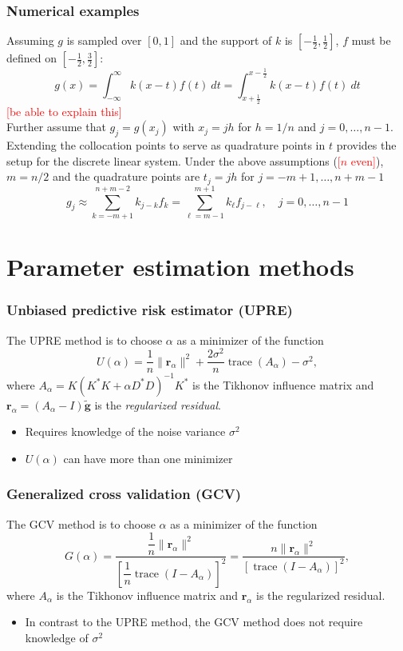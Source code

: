\documentclass{beamer}
\newcommand{\ToDo}[1]{\textcolor{red}{[#1]}}
\newcommand{\noiseSD}{\sigma}	%
\newcommand{\gnoiseVec}{\widetilde{\mathbf{g}}}	%
\newcommand{\kMat}{K}	%
\newcommand{\ctrans}{*}	%
\DeclareMathOperator{\trace}{trace}		%
\newcommand{\regparam}{\alpha}
\newcommand{\regres}{\mathbf{r}_{\regparam}}	%
\newcommand{\A}{A_{\regparam}}	%
\newcommand{\U}{U}	%
\newcommand{\GCV}{G}	%
\begin{document}
\begin{frame}
\frametitle{Numerical examples}
Assuming $g$ is sampled over $[0,1]$ and the support of $k$ is $[-\frac{1}{2},\frac{1}{2}]$, $f$ must be defined on $[-\frac{1}{2},\frac{3}{2}]$:
\[g(x) = \int_{-\infty}^{\infty} k(x-t)f(t)~dt = \int_{x+\frac{1}{2}}^{x-\frac{1}{2}} k(x-t)f(t)~dt\]
\ToDo{be able to explain this} \\
Further assume that $g_j = g(x_j)$ with $x_j = jh$ for $h = 1/n$ and $j = 0,\ldots,n-1$. Extending the collocation points to serve as quadrature points in $t$ provides the setup for the discrete linear system. Under the above assumptions (\ToDo{$n$ even}), $m = n/2$ and the quadrature points are $t_j = jh$ for $j = -m+1,\ldots,n+m-1$
\[g_j \approx \sum_{k=-m+1}^{n+m-2} k_{j-k}f_{k} = \sum_{\ell=m-1}^{m+1} k_{\ell}f_{j-\ell}, \quad j = 0,\ldots,n-1\]
\end{frame}

\section{Parameter estimation methods}

\begin{frame}
\frametitle{Unbiased predictive risk estimator (UPRE)}
The UPRE method \cite{Mallows1973} is to choose $\regparam$ as a minimizer of the function
\[\U(\regparam) = \frac{1}{n}\|\regres\|^2 + \frac{2\noiseSD^2}{n}\trace(\A) - \noiseSD^2,\]
where $\A = \kMat(\kMat^\ctrans{\kMat} + \regparam{D^\ctrans}D)^{-1}\kMat^\ctrans$ is the Tikhonov influence matrix and $\regres = (\A - I)\gnoiseVec$ is the \textit{regularized residual}.
\begin{itemize}
\item Requires knowledge of the noise variance $\noiseSD^2$
\item $\U(\regparam)$ can have more than one minimizer
\end{itemize}
\end{frame}

\begin{frame}
\frametitle{Generalized cross validation (GCV)}
The GCV method \cite{Wahba1977,Wahba1990} is to choose $\regparam$ as a minimizer of the function
\[\GCV(\regparam) = \frac{\dfrac{1}{n}\|\regres\|^2}{\left[\dfrac{1}{n}\trace(I-\A)\right]^2} = \frac{n\|\regres\|^2}{\left[\trace(I-\A)\right]^2},\]
where $\A$ is the Tikhonov influence matrix and $\regres$ is the regularized residual.
\begin{itemize}
\item In contrast to the UPRE method, the GCV method does not require knowledge of $\noiseSD^2$
\end{itemize}
\end{frame}
\end{document}
